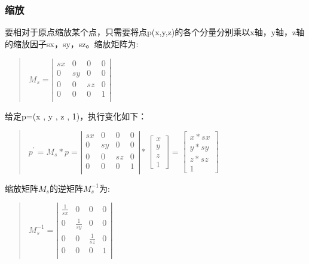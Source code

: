 \documentclass[a4paper,10pt]{article}
\begin{document}
\begin{CJK}{UTF8}{song}
\subsubsection{缩放}
要相对于原点缩放某个点，只需要将点p(x,y,z)的各个分量分别乘以x轴，y轴，z轴的缩放因子sx，sy，sz。缩放矩阵为:
\begin{quote}
\begin{math}
M_{s}=\left|
\begin{array}{cccc}
sx & 0 & 0 & 0 \\
0 & sy & 0 & 0 \\
0 & 0 & sz & 0 \\
0 & 0 & 0 & 1  \\
\end{array}
\right|
\end{math}
\end{quote}
给定p=(x , y , z , 1)，执行变化如下：
\begin{quote}
\begin{math}
p^{'}=M_{s}*p=
\left|
\begin{array}{cccc}
sx & 0 & 0 & 0 \\
0 & sy & 0 & 0 \\
0 & 0 & sz & 0 \\
0 & 0 & 0  & 1 \\
\end{array}
\right| *\left[\begin{array}{c} x \\ y \\ z \\ 1 \end{array} \right]
=\left[\begin{array}{c} x*sx \\ y* sy \\ z*sz \\ 1 \end{array} \right]
\end{math}
\end{quote}
缩放矩阵$M_{s}$的逆矩阵$M_{s}^{-1}$为:
\begin{quote}
\begin{math}
M_{s}^{-1}=\left|
\begin{array}{cccc}
\frac{1}{sx} & 0 & 0 & 0 \\
0 & \frac{1}{sy} & 0 & 0 \\
0 & 0 & \frac{1}{sz} & 0 \\
0 & 0 & 0 & 1 \\
\end{array}
\right| 
\end{math}
\end{quote}

\end{CJK}
\end{document}
